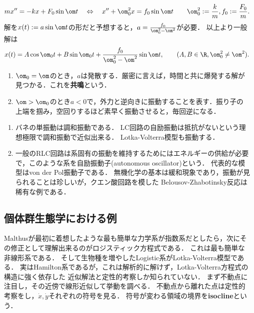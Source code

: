 \documentclass[uplatex,dvipdfmx]{jsreport}
\begin{document}
\begin{model}
    \[mx''=-kx+F_0\sin\om t\quad\Leftrightarrow\quad x''+\om_0^2x=f_0\sin\om t\qquad\om^2_0:=\frac{k}{m},f_0:=\frac{F_0}{m}.\]
    解を$x(t):=a\sin\om t$の形だと予想すると，$a=\frac{f_0}{\om_0^2-\om^2}$が必要．
    以上より一般解は
    \[x(t)=A\cos\om_0t+B\sin\om_0t+\frac{f_0}{\om_0^2-\om^2}\sin\om t,\qquad (A,B\in\R,\om_0^2\ne\om^2).\]
    \begin{enumerate}
        \item $\om_0=\om$のとき，$a$は発散する．厳密に言えば，時間と共に爆発する解が見つかる．これを\textbf{共鳴}という．
        \item $\om>\om_0$のとき$a<0$で，外力と逆向きに振動することを表す．振り子の上端を掴み，空回りするほど素早く振動させると，毎回逆になる．
    \end{enumerate}
\end{model}

\begin{example}[自励振動]\mbox{}
    \begin{enumerate}
        \item バネの単振動は調和振動である．
        LC回路の自励振動は抵抗がないという理想極限で調和振動で近似出来る．
        Lotka-Volterra模型も振動する．
        \item 一般のRLC回路は系固有の振動を維持するためにはエネルギーの供給が必要で，このような系を自励振動子(autonomous oscillator)という．
        代表的な模型はvon der Pol振動子である．
        無機化学の基本は緩和現象であり，振動が見られることは珍しいが，クエン酸回路を模した
        Belousov-Zhabotinsky反応は稀有な例である．
    \end{enumerate}
\end{example}

\subsection{個体群生態学における例}

\begin{tcolorbox}[colframe=ForestGreen, colback=ForestGreen!10!white,breakable,colbacktitle=ForestGreen!40!white,coltitle=black,fonttitle=\bfseries\sffamily,
title=]
    Malthusが最初に着想したような最も簡単な力学系が指数系だとしたら，次にその修正として理解出来るのがロジスティック方程式である．
    これは最も簡単な非線形系である．
    そして生物種を増やしたLogistic系がLotka-Volterra模型である．
    実はHamilton系であるが，これは解析的に解けず，Lotka-Volterra方程式の構造に強く依存した
    近似解法と定性的考察しか知られていない．
    まず不動点に注目し，その近傍で線形近似して挙動を調べる．
    不動点から離れた点は定性的考察をし，$\dot{x},\dot{y}$それぞれの符号を見る．
    符号が変わる領域の境界を\textbf{isocline}という．
\end{tcolorbox}
\end{document}
